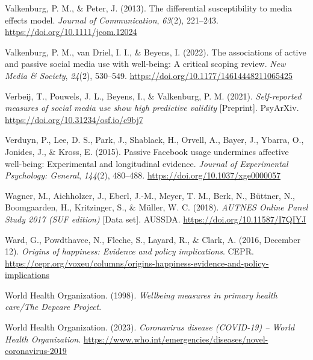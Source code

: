 \documentclass[
  man,mask,floatsintext]{apa7}
\newlength{\cslhangindent}
\newlength{\cslentryspacingunit} %
\newenvironment{CSLReferences}[2] %
 {%
  \setlength{\parindent}{0pt}
  \ifodd #1
  \let\oldpar\par
  \def\par{\hangindent=\cslhangindent\oldpar}
  \fi
  \setlength{\parskip}{#2\cslentryspacingunit}
 }%
 {}
\begin{document}
\begin{CSLReferences}{1}{0}
\leavevmode{}%
Valkenburg, P. M., \& Peter, J. (2013). The differential susceptibility to media effects model. \emph{Journal of Communication}, \emph{63}(2), 221--243. \url{https://doi.org/10.1111/jcom.12024}

\leavevmode{}%
Valkenburg, P. M., van Driel, I. I., \& Beyens, I. (2022). The associations of active and passive social media use with well-being: {A} critical scoping review. \emph{New Media \& Society}, \emph{24}(2), 530--549. \url{https://doi.org/10.1177/14614448211065425}

\leavevmode{}%
Verbeij, T., Pouwels, J. L., Beyens, I., \& Valkenburg, P. M. (2021). \emph{Self-reported measures of social media use show high predictive validity} {[}Preprint{]}. {PsyArXiv}. \url{https://doi.org/10.31234/osf.io/c9bj7}

\leavevmode{}%
Verduyn, P., Lee, D. S., Park, J., Shablack, H., Orvell, A., Bayer, J., Ybarra, O., Jonides, J., \& Kross, E. (2015). Passive {Facebook} usage undermines affective well-being: {Experimental} and longitudinal evidence. \emph{Journal of Experimental Psychology: General}, \emph{144}(2), 480--488. \url{https://doi.org/10.1037/xge0000057}

\leavevmode{}%
Wagner, M., Aichholzer, J., Eberl, J.-M., Meyer, T. M., Berk, N., Büttner, N., Boomgaarden, H., Kritzinger, S., \& Müller, W. C. (2018). \emph{{AUTNES Online Panel Study} 2017 ({SUF} edition)} {[}Data set{]}. {AUSSDA}. \url{https://doi.org/10.11587/I7QIYJ}

\leavevmode{}%
Ward, G., Powdthavee, N., Fleche, S., Layard, R., \& Clark, A. (2016, December 12). \emph{Origins of happiness: {Evidence} and policy implications}. {CEPR}. \url{https://cepr.org/voxeu/columns/origins-happiness-evidence-and-policy-implications}

\leavevmode{}%
World Health Organization. (1998). \emph{Wellbeing measures in primary health care/{The Depcare Project}}.

\leavevmode{}%
World Health Organization. (2023). \emph{Coronavirus disease ({COVID-19}) -- {World Health Organization}}. \url{https://www.who.int/emergencies/diseases/novel-coronavirus-2019}


\end{CSLReferences}
\end{document}
